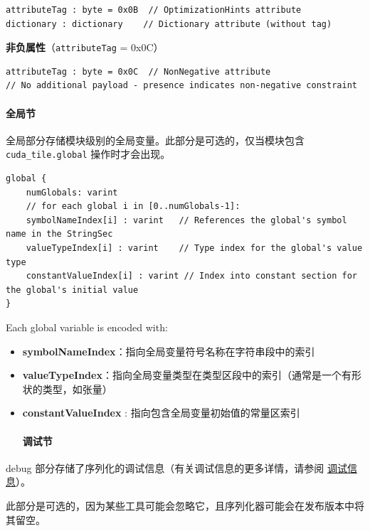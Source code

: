 \documentclass{article}
\begin{document}
\begin{lstlisting}
attributeTag : byte = 0x0B  // OptimizationHints attribute
dictionary : dictionary    // Dictionary attribute (without tag)
\end{lstlisting}

\textbf{非负属性}（\texttt{attributeTag} = 0x0C）


\begin{lstlisting}
attributeTag : byte = 0x0C  // NonNegative attribute
// No additional payload - presence indicates non-negative constraint
\end{lstlisting}


\paragraph{全局节}

全局部分存储模块级别的全局变量。此部分是可选的，仅当模块包含 \texttt{cuda\_tile.global} 操作时才会出现。


\begin{lstlisting}
global {
    numGlobals: varint
    // for each global i in [0..numGlobals-1]:
    symbolNameIndex[i] : varint   // References the global's symbol name in the StringSec
    valueTypeIndex[i] : varint    // Type index for the global's value type
    constantValueIndex[i] : varint // Index into constant section for the global's initial value
}
\end{lstlisting}

Each global variable is encoded with:


\begin{itemize}
\item \textbf{symbolNameIndex}：指向全局变量符号名称在字符串段中的索引
\item \textbf{valueTypeIndex}：指向全局变量类型在类型区段中的索引（通常是一个有形状的类型，如张量）
\item \textbf{constantValueIndex} : 指向包含全局变量初始值的常量区索引


\paragraph{调试节}

\end{itemize}
debug 部分存储了序列化的调试信息（有关调试信息的更多详情，请参阅 \href{https://docs.nvidia.com/cuda/tile-ir/latest/sections/debug_info.html#section-debug-info}{调试信息}）。

此部分是可选的，因为某些工具可能会忽略它，且序列化器可能会在发布版本中将其留空。
\end{document}

